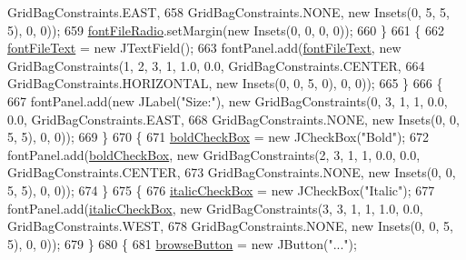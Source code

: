 \begin{DoxyCode}
      GridBagConstraints.EAST,
658                     GridBagConstraints.NONE, \textcolor{keyword}{new} Insets(0, 5, 5, 5), 0, 0));
659                 \mbox{\hyperlink{classorg_1_1newdawn_1_1slick_1_1tools_1_1hiero_1_1_hiero_a2adc5b7c8bcbf375142240e2ab009adf}{fontFileRadio}}.setMargin(\textcolor{keyword}{new} Insets(0, 0, 0, 0));
660             \}
661             \{
662                 \mbox{\hyperlink{classorg_1_1newdawn_1_1slick_1_1tools_1_1hiero_1_1_hiero_a0711e1f725339751c6784796d43bf97a}{fontFileText}} = \textcolor{keyword}{new} JTextField();
663                 fontPanel.add(\mbox{\hyperlink{classorg_1_1newdawn_1_1slick_1_1tools_1_1hiero_1_1_hiero_a0711e1f725339751c6784796d43bf97a}{fontFileText}}, \textcolor{keyword}{new} GridBagConstraints(1, 2, 3, 1, 1.0, 0.0, 
      GridBagConstraints.CENTER,
664                     GridBagConstraints.HORIZONTAL, \textcolor{keyword}{new} Insets(0, 0, 5, 0), 0, 0));
665             \}
666             \{
667                 fontPanel.add(\textcolor{keyword}{new} JLabel(\textcolor{stringliteral}{"Size:"}), \textcolor{keyword}{new} GridBagConstraints(0, 3, 1, 1, 0.0, 0.0, 
      GridBagConstraints.EAST,
668                     GridBagConstraints.NONE, \textcolor{keyword}{new} Insets(0, 0, 5, 5), 0, 0));
669             \}
670             \{
671                 \mbox{\hyperlink{classorg_1_1newdawn_1_1slick_1_1tools_1_1hiero_1_1_hiero_a605e35729a7fd5437c5fa9692cd44c74}{boldCheckBox}} = \textcolor{keyword}{new} JCheckBox(\textcolor{stringliteral}{"Bold"});
672                 fontPanel.add(\mbox{\hyperlink{classorg_1_1newdawn_1_1slick_1_1tools_1_1hiero_1_1_hiero_a605e35729a7fd5437c5fa9692cd44c74}{boldCheckBox}}, \textcolor{keyword}{new} GridBagConstraints(2, 3, 1, 1, 0.0, 0.0, 
      GridBagConstraints.CENTER,
673                     GridBagConstraints.NONE, \textcolor{keyword}{new} Insets(0, 0, 5, 5), 0, 0));
674             \}
675             \{
676                 \mbox{\hyperlink{classorg_1_1newdawn_1_1slick_1_1tools_1_1hiero_1_1_hiero_a4c571b425b96934d5298ae39b155db87}{italicCheckBox}} = \textcolor{keyword}{new} JCheckBox(\textcolor{stringliteral}{"Italic"});
677                 fontPanel.add(\mbox{\hyperlink{classorg_1_1newdawn_1_1slick_1_1tools_1_1hiero_1_1_hiero_a4c571b425b96934d5298ae39b155db87}{italicCheckBox}}, \textcolor{keyword}{new} GridBagConstraints(3, 3, 1, 1, 1.0, 0.0, 
      GridBagConstraints.WEST,
678                     GridBagConstraints.NONE, \textcolor{keyword}{new} Insets(0, 0, 5, 5), 0, 0));
679             \}
680             \{
681                 \mbox{\hyperlink{classorg_1_1newdawn_1_1slick_1_1tools_1_1hiero_1_1_hiero_a2a832e3532956e0f2a7fa390f9b8bc27}{browseButton}} = \textcolor{keyword}{new} JButton(\textcolor{stringliteral}{"..."});

\end{DoxyCode}
